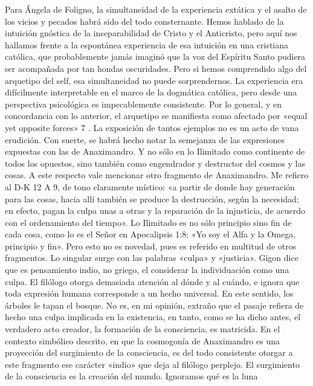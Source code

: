 \documentclass[a4paper]{article}
\begin{document}
Para Ángela de Foligno, la simultaneidad de la experiencia extática y el asalto
de los vicios y pecados habrá sido del todo consternante. Hemos hablado de la
intuición gnóstica de la inseparabilidad de Cristo y el Anticristo, pero aquí
nos hallamos frente a la espontánea experiencia de esa intuición en una
cristiana católica, que probablemente jamás imaginó que la voz del Espíritu
Santo pudiera ser acompañada por tan hondas oscuridades. Pero si hemos
comprendido algo del arquetipo del self, esa simultaneidad no puede
sorprendernos. La experiencia era difícilmente interpretable en el marco de la
dogmática católica, pero desde una perspectiva psicológica es impecablemente
consistente. Por lo general, y en concordancia con lo anterior, el arquetipo se
manifiesta como afectado por «equal yet opposite forces» 7 . La exposición de
tantos ejemplos no es un acto de vana erudición. Con suerte, se habrá hecho
notar la semejanza de las expresiones expuestas con las de Anaximandro. Y no
sólo en lo Ilimitado como continente de todos los opuestos, sino también como
engendrador y destructor del cosmos y las cosas. A este respecto vale mencionar
otro fragmento de Anaximandro. Me refiero al D-K 12 A 9, de tono claramente
místico: «a partir de donde hay generación para las cosas, hacia allí también se
produce la destrucción, según la necesidad; en efecto, pagan la culpa unas a
otras y la reparación de la injusticia, de acuerdo con el ordenamiento del
tiempo». Lo Ilimitado es no sólo principio sino fin de cada cosa, como lo es el
Señor en Apocalipsis 1:8: «Yo soy el Alfa y la Omega, principio y fin». Pero
esto no es novedad, pues es referido en multitud de otros fragmentos. Lo
singular surge con las palabras «culpa» y «justicia». Gigon dice que es
pensamiento indio, no griego, el considerar la individuación como una culpa. El
filólogo otorga demasiada atención al dónde y al cuándo, e ignora que toda
expresión humana corresponde a un hecho universal. En este sentido, los árboles
le tapan el bosque. No es, en mi opinión, extraño que el pasaje refiera de hecho
una culpa implicada en la existencia, en tanto, como se ha dicho antes, el
verdadero acto creador, la formación de la consciencia, es matricida. En el
contexto simbólico descrito, en que la cosmogonía de Anaximandro es una
proyección del surgimiento de la consciencia, es del todo consistente otorgar a
este fragmento ese carácter «indio» que deja al filólogo perplejo. El
surgimiento de la consciencia es la creación del mundo. Ignoramos qué es la luna
\end{document}
